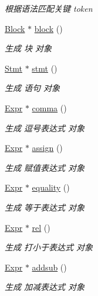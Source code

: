 \begin{DoxyCompactItemize}
\begin{DoxyCompactList}\small\item\em 根据语法匹配关键 token \end{DoxyCompactList}\item 
\hyperlink{class_block}{Block} $\ast$ \hyperlink{class_parser_a2e96322fd6d40261ab256a726634c1b3}{block} ()
\begin{DoxyCompactList}\small\item\em 生成 块 对象 \end{DoxyCompactList}\item 
\hyperlink{class_stmt}{Stmt} $\ast$ \hyperlink{class_parser_ab1ae72a37dbe2118ab65ad8f4dec4630}{stmt} ()
\begin{DoxyCompactList}\small\item\em 生成 语句 对象 \end{DoxyCompactList}\item 
\hyperlink{class_expr}{Expr} $\ast$ \hyperlink{class_parser_abf18837a6acc9b543969706108d1191f}{comma} ()
\begin{DoxyCompactList}\small\item\em 生成 逗号表达式 对象 \end{DoxyCompactList}\item 
\hyperlink{class_expr}{Expr} $\ast$ \hyperlink{class_parser_a24a9ce00f5db17f1e2b2019d6791a7e3}{assign} ()
\begin{DoxyCompactList}\small\item\em 生成 赋值表达式 对象 \end{DoxyCompactList}\item 
\hyperlink{class_expr}{Expr} $\ast$ \hyperlink{class_parser_acf81bd28478a78855da7271b0dd7a09d}{equality} ()
\begin{DoxyCompactList}\small\item\em 生成 等于表达式 对象 \end{DoxyCompactList}\item 
\hyperlink{class_expr}{Expr} $\ast$ \hyperlink{class_parser_a8ca8a4997cc230fb127ddb34986e9ffd}{rel} ()
\begin{DoxyCompactList}\small\item\em 生成 打小于表达式 对象 \end{DoxyCompactList}\item 
\hyperlink{class_expr}{Expr} $\ast$ \hyperlink{class_parser_a198213e9e10727dab4b6f54ee781958b}{addsub} ()
\begin{DoxyCompactList}\small\item\em 生成 加减表达式 对象 \end{DoxyCompactList}\item 

\end{DoxyCompactItemize}
